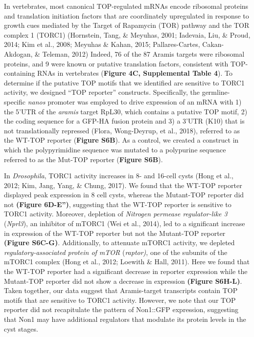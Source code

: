 \documentclass[12pt,twoside]{reedthesis}
\begin{document}
In vertebrates, most canonical TOP-regulated mRNAs encode ribosomal
proteins and translation initiation factors that are coordinately
upregulated in response to growth cues mediated by the Target of
Rapamycin (TOR) pathway and the TOR complex 1 (TORC1)
(Hornstein, Tang, \& Meyuhas, 2001; Iadevaia, Liu, \& Proud, 2014; Kim et al., 2008; Meyuhas \& Kahan, 2015; Pallares-Cartes, Cakan-Akdogan, \& Teleman, 2012) Indeed, 76 of the
87 Aramis targets were ribosomal proteins, and 9 were known or putative
translation factors, consistent with TOP-containing RNAs in vertebrates
(\textbf{Figure 4C, Supplemental Table 4}). To determine if the putative TOP
motifs that we identified are sensitive to TORC1 activity, we designed
``TOP reporter'' constructs. Specifically, the germline-specific \emph{nanos}
promoter was employed to drive expression of an mRNA with 1) the 5'UTR
of the \emph{aramis} target RpL30, which contains a putative TOP motif, 2)
the coding sequence for a GFP-HA fusion protein and 3) a 3'UTR (K10)
that is not translationally repressed (Flora, Wong-Deyrup, et al., 2018), referred to as
the WT-TOP reporter (\textbf{Figure S6B}). As a control, we created a
construct in which the polypyrimidine sequence was mutated to a
polypurine sequence referred to as the Mut-TOP reporter (\textbf{Figure
S6B}).

In \emph{Drosophila}, TORC1 activity increases in 8- and 16-cell cysts
(Hong et al., 2012; Kim, Jang, Yang, \& Chung, 2017). We found that the WT-TOP reporter
displayed peak expression in 8 cell cysts, whereas the Mutant-TOP
reporter did not \textbf{(Figure 6D-E'')}, suggesting that the WT-TOP
reporter is sensitive to TORC1 activity. Moreover, depletion of
\emph{Nitrogen permease regulator-like 3} (\emph{Nprl3}), an inhibitor of mTORC1
(Wei et al., 2014), led to a significant increase in expression of the
WT-TOP reporter but not the Mutant-TOP reporter \textbf{(Figure S6C-G)}.
Additionally, to attenuate mTORC1 activity, we depleted
\emph{regulatory-associated protein of mTOR} (\emph{raptor)}, one of the subunits
of the mTORC1 complex (Hong et al., 2012; Loewith \& Hall, 2011). Here we found that the WT-TOP
reporter had a significant decrease in reporter expression while the
Mutant-TOP reporter did not show a decrease in expression \textbf{(Figure
S6H-L)}. Taken together, our data suggest that Aramis-target
transcripts contain TOP motifs that are sensitive to TORC1 activity.
However, we note that our TOP reporter did not recapitulate the pattern
of Non1::GFP expression, suggesting that Non1 may have additional
regulators that modulate its protein levels in the cyst stages.
\end{document}
